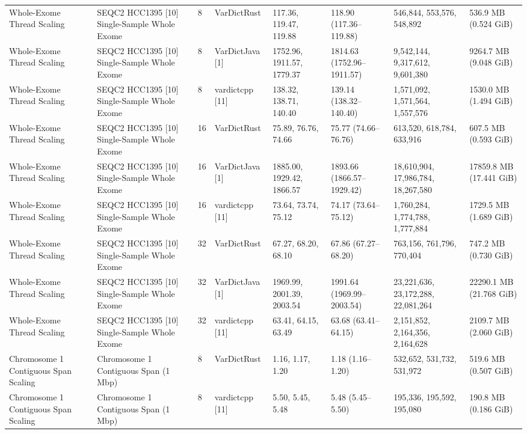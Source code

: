 \begin{table}[htbp]
{\begin{tabular}{llllllll}
Whole-Exome Thread Scaling & SEQC2 HCC1395 [10] Single-Sample Whole Exome & 8 & VarDictRust & 117.36, 119.47, 119.88 & 118.90 (117.36--119.88) & 546,844, 553,576, 548,892 & 536.9 MB (0.524 GiB) \\
Whole-Exome Thread Scaling & SEQC2 HCC1395 [10] Single-Sample Whole Exome & 8 & VarDictJava [1] & 1752.96, 1911.57, 1779.37 & 1814.63 (1752.96--1911.57) & 9,542,144, 9,317,612, 9,601,380 & 9264.7 MB (9.048 GiB) \\
Whole-Exome Thread Scaling & SEQC2 HCC1395 [10] Single-Sample Whole Exome & 8 & vardictcpp [11] & 138.32, 138.71, 140.40 & 139.14 (138.32--140.40) & 1,571,092, 1,571,564, 1,557,576 & 1530.0 MB (1.494 GiB) \\
Whole-Exome Thread Scaling & SEQC2 HCC1395 [10] Single-Sample Whole Exome & 16 & VarDictRust & 75.89, 76.76, 74.66 & 75.77 (74.66--76.76) & 613,520, 618,784, 633,916 & 607.5 MB (0.593 GiB) \\
Whole-Exome Thread Scaling & SEQC2 HCC1395 [10] Single-Sample Whole Exome & 16 & VarDictJava [1] & 1885.00, 1929.42, 1866.57 & 1893.66 (1866.57--1929.42) & 18,610,904, 17,986,784, 18,267,580 & 17859.8 MB (17.441 GiB) \\
Whole-Exome Thread Scaling & SEQC2 HCC1395 [10] Single-Sample Whole Exome & 16 & vardictcpp [11] & 73.64, 73.74, 75.12 & 74.17 (73.64--75.12) & 1,760,284, 1,774,788, 1,777,884 & 1729.5 MB (1.689 GiB) \\
Whole-Exome Thread Scaling & SEQC2 HCC1395 [10] Single-Sample Whole Exome & 32 & VarDictRust & 67.27, 68.20, 68.10 & 67.86 (67.27--68.20) & 763,156, 761,796, 770,404 & 747.2 MB (0.730 GiB) \\
Whole-Exome Thread Scaling & SEQC2 HCC1395 [10] Single-Sample Whole Exome & 32 & VarDictJava [1] & 1969.99, 2001.39, 2003.54 & 1991.64 (1969.99--2003.54) & 23,221,636, 23,172,288, 22,081,264 & 22290.1 MB (21.768 GiB) \\
Whole-Exome Thread Scaling & SEQC2 HCC1395 [10] Single-Sample Whole Exome & 32 & vardictcpp [11] & 63.41, 64.15, 63.49 & 63.68 (63.41--64.15) & 2,151,852, 2,164,356, 2,164,628 & 2109.7 MB (2.060 GiB) \\
Chromosome 1 Contiguous Span Scaling & Chromosome 1 Contiguous Span (1 Mbp) & 8 & VarDictRust & 1.16, 1.17, 1.20 & 1.18 (1.16--1.20) & 532,652, 531,732, 531,972 & 519.6 MB (0.507 GiB) \\
Chromosome 1 Contiguous Span Scaling & Chromosome 1 Contiguous Span (1 Mbp) & 8 & vardictcpp [11] & 5.50, 5.45, 5.48 & 5.48 (5.45--5.50) & 195,336, 195,592, 195,080 & 190.8 MB (0.186 GiB) \\

\end{tabular}}
\end{table}
